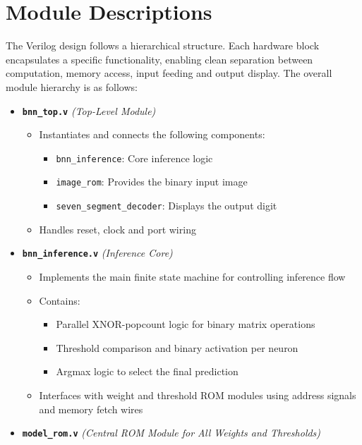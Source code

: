 \documentclass[a4paper,12pt]{report}
\begin{document}
\section{Module Descriptions}
The Verilog design follows a hierarchical structure. Each hardware block encapsulates a specific functionality, enabling clean separation between computation, memory access, input feeding and output display. The overall module hierarchy is as follows:
\begin{itemize}
    \item \textbf{\texttt{bnn\_top.v}} \textit{(Top-Level Module)}
    \begin{itemize}
        \item Instantiates and connects the following components:
        \begin{itemize}
            \item[\textperiodcentered] \texttt{bnn\_inference}: Core inference logic
            \item[\textperiodcentered] \texttt{image\_rom}: Provides the binary input image
            \item[\textperiodcentered] \texttt{seven\_segment\_decoder}: Displays the output digit
        \end{itemize}
        \item Handles reset, clock and port wiring
    \end{itemize}
    \item \textbf{\texttt{bnn\_inference.v}} \textit{(Inference Core)}
    \begin{itemize}
        \item Implements the main finite state machine for controlling inference flow
        \item Contains:
        \begin{itemize}
            \item[\textperiodcentered] Parallel XNOR-popcount logic for binary matrix operations
            \item[\textperiodcentered] Threshold comparison and binary activation per neuron
            \item[\textperiodcentered] Argmax logic to select the final prediction
        \end{itemize}
        \item Interfaces with weight and threshold ROM modules using address signals and memory fetch wires
    \end{itemize}
    \item \textbf{\texttt{model\_rom.v}} \textit{(Central ROM Module for All Weights and Thresholds)}

\end{itemize}
\end{document}

